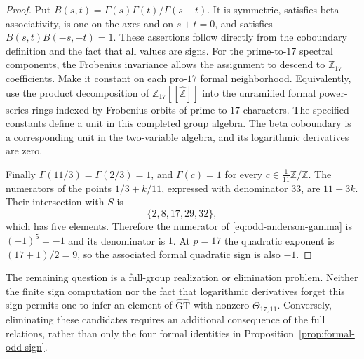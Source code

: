 \begin{proof}
Put $B(s,t)=\Gamma(s)\Gamma(t)/\Gamma(s+t)$.  It is symmetric,
satisfies beta associativity, is one on the axes and on $s+t=0$,
and satisfies $B(s,t)B(-s,-t)=1$.  These assertions follow directly
from the coboundary definition and the fact that all values are signs.
For the prime-to-$17$ spectral components, the Frobenius invariance
allows the assignment to descend to $\mathbb Z_{17}$ coefficients.
Make it constant on each pro-$17$ formal neighborhood.  Equivalently,
use the product decomposition of
$\mathbb Z_{17}[[\widehat{\mathbb Z}]]$ into the unramified formal
power-series rings indexed by Frobenius orbits of prime-to-$17$
characters.  The specified constants define a unit in this completed
group algebra.  The beta coboundary is a corresponding unit in the
two-variable algebra, and its logarithmic derivatives are zero.

Finally $\Gamma(11/3)=\Gamma(2/3)=1$, and $\Gamma(c)=1$ for
every $c\in\frac1{11}\mathbb Z/\mathbb Z$.  The numerators of the
points $1/3+k/11$, expressed with denominator $33$, are $11+3k$.
Their intersection with $S$ is
\[
 \{2,8,17,29,32\},
\]
which has five elements.  Therefore the numerator of
\eqref{eq:odd-anderson-gamma} is $(-1)^5=-1$ and its denominator
is $1$.  At $p=17$ the quadratic exponent is $(17+1)/2=9$, so
the associated formal quadratic sign is also $-1$.
\end{proof}

The remaining question is a full-group realization or elimination
problem.  Neither the finite sign computation nor the fact that
logarithmic derivatives forget this sign permits one to infer an
element of $\widehat{\mathrm{GT}}$ with nonzero
$\Theta_{17,11}$.  Conversely, eliminating these candidates requires
an additional consequence of the full relations, rather than only
the four formal identities in Proposition~\ref{prop:formal-odd-sign}.


